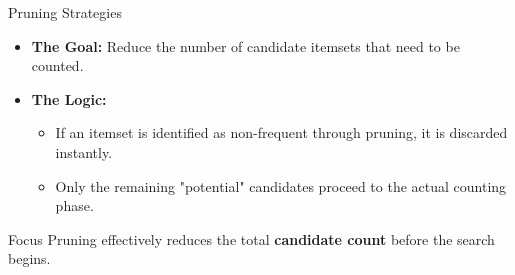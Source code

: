 \begin{frame}[t]{Pruning Strategies}
    \begin{itemize}
        \item \textbf{The Goal:} Reduce the number of candidate itemsets that need to be counted.
        \item \textbf{The Logic:}
        \begin{itemize}
            \item \small If an itemset is identified as non-frequent through pruning, it is discarded instantly.
            \item \small Only the remaining "potential" candidates proceed to the actual counting phase.
        \end{itemize}
    \end{itemize}

    \begin{center}
    \end{center}
    
    \begin{alertblock}{Focus}
        \footnotesize Pruning effectively reduces the total \textbf{candidate count} before the search begins.
    \end{alertblock}
\end{frame}

